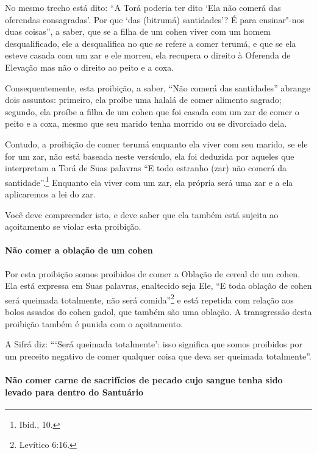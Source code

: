 \begin{multicols}{2}
No mesmo trecho está dito: ``A Torá\starr{} poderia ter dito `Ela não comerá
das oferendas consagradas'. Por que `das (bitrumá\starr) santidades'? É para
ensinar"-nos duas coisas'', a saber, que se a filha de um cohen\starr{} viver
com um homem desqualificado, ele a desqualifica no que se refere a comer
terumá\starr, e que se ela esteve casada com um
zar\starr{} e ele morreu, ela recupera o direito à
Oferenda de Elevação mas não o direito ao peito e a coxa.
 
Consequentemente, esta proibição, a saber, ``Não comerá das santidades''
abrange dois assuntos: primeiro, ela proíbe uma halalá\starr{} de comer
alimento sagrado; segundo, ela proíbe a filha de um cohen\starr{} que foi
casada com um zar\starr{} de comer o peito e a coxa, mesmo que seu marido
tenha morrido ou se divorciado dela.

Contudo, a proibição de comer terumá\starr{} enquanto ela viver com seu
marido, se ele for um zar\starr, não está baseada neste versículo, ela foi
deduzida por aqueles que interpretam a Torá\starr{} de Suas palavras ``E todo
estranho (zar\starr) não comerá da santidade''.\footnote{Ibid., 10.} Enquanto ela viver
com um zar\starr, ela própria será uma zar\starr{} e a ela aplicaremos a lei
do zar\starr.

Você deve compreender isto, e deve saber que ela também está sujeita ao
açoitamento se violar esta proibição.

\paragraph{Não comer a oblação de um cohen\starr{}}

Por esta proibição somos proibidos de comer a Oblação de cereal de um
cohen\starr. Ela está expressa em Suas palavras, enaltecido seja Ele, ``E
toda oblação de cohen\starr{} será queimada totalmente, não será comida''\footnote{Levítico 6:16.} e está repetida com relação aos bolos assados do cohen gadol\starr, que também são uma oblação. A transgressão desta proibição
também é punida com o açoitamento.

A Sifrá\starr{} diz: ```Será queimada totalmente': isso significa que somos
proibidos por um preceito negativo de comer qualquer coisa que deva ser
queimada totalmente''.

\paragraph{Não comer carne de sacrifícios de pecado cujo sangue tenha sido
levado para dentro do Santuário}


\end{multicols}
